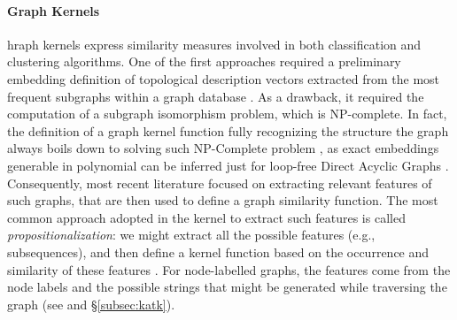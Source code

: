  
\paragraph*{Graph Kernels} hraph kernels express similarity measures \cite{Samatova} involved in both classification \cite{TsudaS10} and clustering algorithms. One of the first approaches required a preliminary embedding definition of topological description vectors extracted from the most frequent subgraphs within a graph database \cite{Sidere}. As a drawback, it required the computation of a subgraph isomorphism problem, which is NP-complete. In fact, the definition of a graph kernel function fully recognizing the structure the graph always boils down to solving such NP-Complete problem \cite{GartnerFW03}, as exact embeddings generable in polynomial can be inferred just for loop-free Direct Acyclic Graphs \cite{BergamiBM20}. Consequently, most recent literature focused on extracting relevant features of such graphs, that are then used to define a graph similarity function. The most common approach adopted in the kernel to extract such features is called \textit{propositionalization}: we might extract all the possible features (e.g., subsequences), and then define a kernel function based on the occurrence and similarity of these features \cite{Gartner03}. For node-labelled graphs, the features come from the node labels and the possible strings that might be generated while traversing the graph (see \cite{Gartner03} and \S\ref{subsec:katk}). 